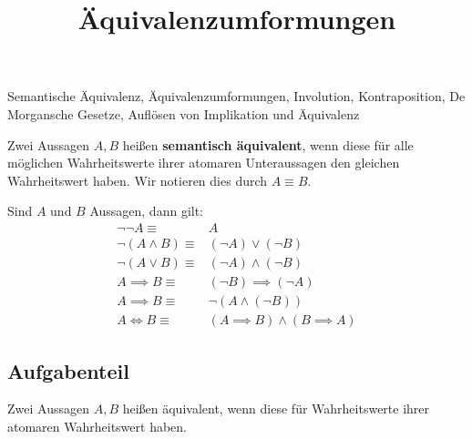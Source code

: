 \documentclass{uebungsblatt}
\title{Äquivalenzumformungen}
\begin{document}
\maketitle
\begin{contents}
    Semantische Äquivalenz, Äquivalenzumformungen, Involution, Kontraposition, De Morgansche Gesetze, Auflösen von Implikation und Äquivalenz
\end{contents}


\begin{definition}
    Zwei Aussagen $A,B$ heißen \textbf{semantisch äquivalent}, wenn diese für alle möglichen Wahrheitswerte ihrer
        atomaren Unteraussagen den gleichen Wahrheitswert haben. Wir notieren dies durch $A \equiv B$.
\end{definition}

\begin{theorem}
    Sind $A$ und $B$ Aussagen, dann gilt:
    \begin{align*}
        \tag{Involution}
        \lnot \lnot A \equiv& A\\
        \tag{1. De Morgansches Gesetz}
        \lnot (A \land B) \equiv& (\lnot A) \lor (\lnot B)\\
        \tag{2. De Morgansches Gesetz}
        \lnot (A \lor B) \equiv& (\lnot A) \land (\lnot B)\\
        \tag{Kontraposition}
        A \implies B \equiv& (\lnot B) \implies (\lnot A)\\
        \tag{Auflösen der Implikation}
        A \implies B \equiv & \lnot (A \land (\lnot B))\\
        \tag{Auflösen der Äquivalenz}
        A \iff B \equiv & (A \implies B) \land (B \implies A)
    \end{align*}
\end{theorem}

\subsection*{Aufgabenteil}

\begin{exercise}
    Zwei Aussagen $A,B$ heißen  äquivalent, 
    wenn diese für
     Wahrheitswerte ihrer atomaren 
    Wahrheitswert haben.
\end{exercise}
\end{document}
